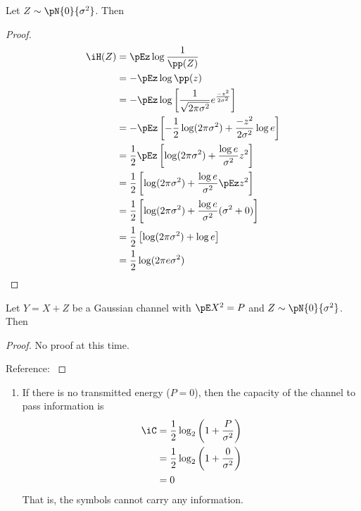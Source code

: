 {%
\begin{theorem}
Let $Z\sim\pN{0}{\sigma^2}$. Then
\end{theorem}
\begin{proof}
\begin{align*}
  \iH(Z)
    &= \pEz \log \frac{1}{\pp(Z)}
  \\&= -\pEz \log \pp(z)
  \\&= -\pEz
         \log \left[\frac{1}{\sqrt{2\pi\sigma^2}}e^{\frac{-z^2}{2\sigma^2}} \right]
  \\&= -\pEz \left[
        -\frac{1}{2}\log(2\pi\sigma^2)
        + \frac{-z^2}{2\sigma^2} \log e
        \right]
  \\&= \frac{1}{2} \pEz \left[
        \log(2\pi\sigma^2)
        + \frac{\log e}{\sigma^2}z^2
        \right]
  \\&= \frac{1}{2} \left[
        \log(2\pi\sigma^2) + \frac{\log e}{\sigma^2}\pEz z^2
        \right]
  \\&= \frac{1}{2} \left[
        \log(2\pi\sigma^2) + \frac{\log e}{\sigma^2}(\sigma^2+0)
        \right]
  \\&= \frac{1}{2} \left[
        \log(2\pi\sigma^2) + \log e
        \right]
  \\&= \frac{1}{2} \log(2\pi e\sigma^2)
\end{align*}
\end{proof}

\begin{theorem}
Let $Y=X+Z$ be a Gaussian channel with $\pE X^2=P$ and
$Z\sim\pN{0}{\sigma^2}$. Then
\end{theorem}
\begin{proof}
No proof at this time. \attention

Reference: \cite[page 241]{cover}
\end{proof}

\begin{example}

\begin{enumerate}
  \item If there is no transmitted energy ($P=0$), then the capacity of
        the channel to pass information is
    \begin{align*}
      \iC
        &= \frac{1}{2}\log_2\left( 1 + \frac{P}{\sigma^2}\right)
      \\&= \frac{1}{2}\log_2\left( 1 + \frac{0}{\sigma^2}\right)
      \\&= 0
    \end{align*}
  That is, the symbols cannot carry any information.


\end{enumerate}
\end{example}}
